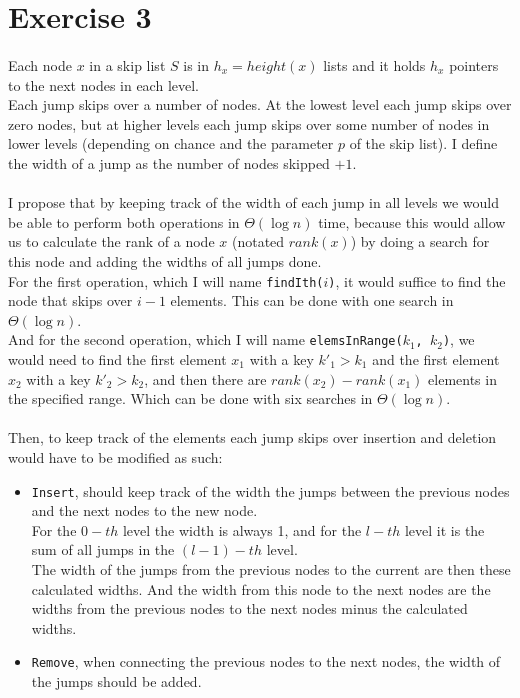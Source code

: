 \documentclass[../main.tex]{subfiles}
\begin{document}
\section{Exercise 3}
\label{sec:ex3}

\paragraph{} Each node \(x\) in a skip list \(S\) is in \(h_{x} = height(x)\) lists and it holds \(h_{x}\) pointers to the next nodes in each level. \\
Each jump skips over a number of nodes. At the lowest level each jump skips over zero nodes, but at higher levels each jump skips over some number of nodes in lower levels (depending on chance and the parameter \(p\) of the skip list). I define the width of a jump as the number of nodes skipped \(+1\).

\paragraph{} I propose that by keeping track of the width of each jump in all levels we would be able to perform both operations in \(\Theta(\log n)\) time, because this would allow us to calculate the rank of a node \(x\) (notated \(rank(x)\)) by doing a search for this node and adding the widths of all jumps done. \\
For the first operation, which I will name \texttt{findIth(\(i\))}, it would suffice to find the node that skips over \(i-1\) elements. This can be done with one search in \(\Theta(\log n)\). \\
And for the second operation, which I will name \texttt{elemsInRange(\(k_{1}\), \(k_{2}\))}, we would need to find the first element \(x_{1}\) with a key \(k'_{1} > k_{1}\) and the first element \(x_{2}\) with a key \(k'_{2} > k_{2}\), and then there are \(rank(x_{2}) - rank(x_{1})\) elements in the specified range. Which can be done with six searches in \(\Theta(\log n)\).

\paragraph{} Then, to keep track of the elements each jump skips over insertion and deletion would have to be modified as such:
\begin{itemize}
  \item \texttt{Insert}, should keep track of the width the jumps between the previous nodes and the next nodes to the new node. \\
    For the \(0-th\) level the width is always 1, and for the \(l-th\) level it is the sum of all jumps in the \((l-1)-th\) level. \\
    The width of the jumps from the previous nodes to the current are then these calculated widths. And the width from this node to the next nodes are the widths from the previous nodes to the next nodes minus the calculated widths.
  \item \texttt{Remove}, when connecting the previous nodes to the next nodes, the width of the jumps should be added.
\end{itemize}
\end{document}

